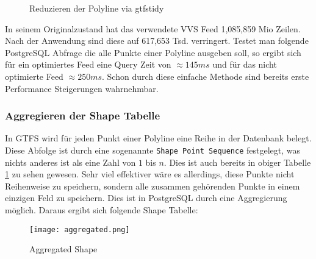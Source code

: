    \begin{figure}[htbp]
      \centering
      \hfill
      \caption{Reduzieren der Polyline via gtfstidy}
      \label{fig:shape_simplify}
    \end{figure}

    In seinem Originalzustand hat das verwendete VVS Feed 1,085,859 Mio Zeilen. Nach der Anwendung sind diese auf 617,653 Tsd. verringert. Testet man folgende PostgreSQL Abfrage
    \colorbox{materialGrey}{\texttt{}}
    die alle Punkte einer Polyline ausgeben soll, so ergibt sich für ein optimiertes Feed eine Query Zeit von $\approx145 ms$ und für das nicht optimierte Feed $\approx250 ms$. Schon durch diese einfache Methode sind bereits erste Performance Steigerungen wahrnehmbar.


  \subsubsection*{Aggregieren der Shape Tabelle}
  \label{ssub:aggregieren_der_shape_tabelle}
    In GTFS wird für jeden Punkt einer Polyline eine Reihe in der Datenbank belegt. Diese Abfolge ist durch eine sogenannte \texttt{Shape Point Sequence} festgelegt, was nichts anderes ist als eine Zahl von $1$ bis $n$. Dies ist auch bereits in obiger Tabelle \ref{fig:shape_simplify} zu sehen gewesen. Sehr viel effektiver wäre es allerdings, diese Punkte nicht Reihenweise zu speichern, sondern alle zusammen gehörenden Punkte in einem einzigen Feld zu speichern. Dies ist in PostgreSQL durch eine Aggregierung möglich. Daraus ergibt sich folgende Shape Tabelle:

    \begin{figure}[htbp]
      \begin{center}
        \texttt{[image: aggregated.png]}
        \caption{Aggregated Shape}
        \label{fig:aggregated}
      \end{center}
    \end{figure}

